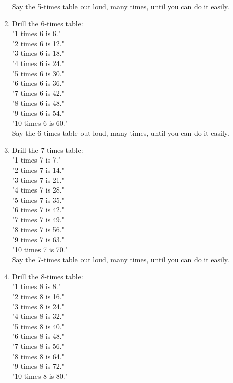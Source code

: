 \documentclass[12pt]{article}
\begin{document}
\begin{enumerate}
Say the 5-times table out loud, many times, until you can do it easily.\\

\item Drill the 6-times table:\\

"1 times 6 is 6."\\
"2 times 6 is 12."\\
"3 times 6 is 18."\\
"4 times 6 is 24."\\
"5 times 6 is 30."\\
"6 times 6 is 36."\\
"7 times 6 is 42."\\
"8 times 6 is 48."\\
"9 times 6 is 54."\\
"10 times 6 is 60."\\

Say the 6-times table out loud, many times, until you can do it easily.\\

\item Drill the 7-times table:\\

"1 times 7 is 7."\\
"2 times 7 is 14."\\
"3 times 7 is 21."\\
"4 times 7 is 28."\\
"5 times 7 is 35."\\
"6 times 7 is 42."\\
"7 times 7 is 49."\\
"8 times 7 is 56."\\
"9 times 7 is 63."\\
"10 times 7 is 70."\\

Say the 7-times table out loud, many times, until you can do it easily.\\

\item Drill the 8-times table:\\

"1 times 8 is 8."\\
"2 times 8 is 16."\\
"3 times 8 is 24."\\
"4 times 8 is 32."\\
"5 times 8 is 40."\\
"6 times 8 is 48."\\
"7 times 8 is 56."\\
"8 times 8 is 64."\\
"9 times 8 is 72."\\
"10 times 8 is 80."\\


\end{enumerate}
\end{document}
